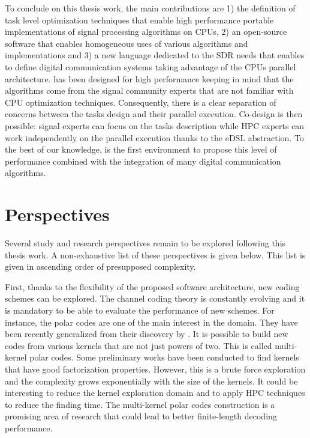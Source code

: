 To conclude on this thesis work, the main contributions are 1) the definition of
task level optimization techniques that enable high performance portable
implementations of signal processing algorithms on CPUs, 2) an open-source
software that enables homogeneous uses of various algorithms and implementations
and 3) a new language dedicated to the SDR needs that enables to define digital
communication systems taking advantage of the CPUs parallel architecture.
\AFFECT has been designed for high performance keeping in mind that the
algorithms come from the signal community experts that are not familiar with CPU
optimization techniques. Consequently, there is a clear separation of concerns
between the tasks design and their parallel execution. Co-design is then
possible: signal experts can focus on the tasks description while HPC experts
can work independently on the parallel execution thanks to the eDSL abstraction.
To the best of our knowledge, \AFFECT is the first environment to propose this
level of performance combined with the integration of many digital communication
algorithms.

\section*{Perspectives}

Several study and research perspectives remain to be explored following this
thesis work. A non-exhaustive list of these perspectives is given below. This
list is given in ascending order of presupposed complexity.

First, thanks to the flexibility of the proposed software architecture, new
coding schemes can be explored. The channel coding theory is constantly evolving
and it is mandatory to be able to evaluate the performance of new schemes. For
instance, the polar codes are one of the main interest in the domain. They have
been recently generalized from their discovery by \Arikan. It is possible to
build new codes from various kernels that are not just powers of two. This is
called multi-kernel polar codes. Some preliminary works have been conducted to
find kernels that have good factorization properties. However, this is a brute
force exploration and the complexity grows exponentially with the size of the
kernels. It could be interesting to reduce the kernel exploration domain and to
apply HPC techniques to reduce the finding time. The multi-kernel polar codes
construction is a promising area of research that could lead to better
finite-length decoding performance.

